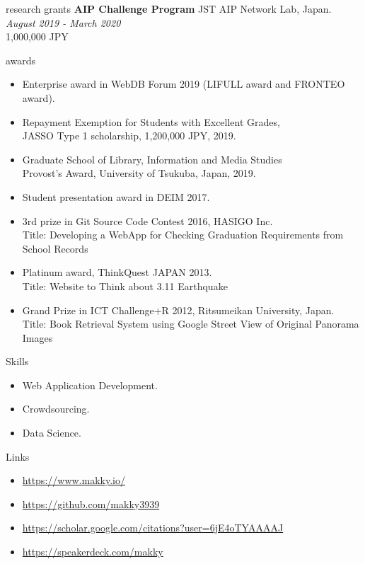 \documentclass{resume} %
\begin{document}
\begin{rSection}{research grants}
{\bf AIP Challenge Program } JST AIP Network Lab, Japan. \hfill {\em August 2019 - March 2020}
\\1,000,000 JPY

\end{rSection}


\begin{rSection}{awards}
\begin{itemize}
  \item Enterprise award in WebDB Forum 2019 (LIFULL award and FRONTEO award).
  \item Repayment Exemption for Students with Excellent Grades, \\JASSO Type 1 scholarship, 1,200,000 JPY, 2019.
  \item Graduate School of Library, Information and Media Studies \\Provost’s Award, University of Tsukuba, Japan, 2019.
  \item Student presentation award in DEIM 2017.
  \item 3rd prize in Git Source Code Contest 2016, HASIGO Inc. \\Title: Developing a WebApp for Checking Graduation Requirements from School Records
  \item Platinum award, ThinkQuest JAPAN 2013. \\Title: Website to Think about 3.11 Earthquake
  \item Grand Prize in ICT Challenge+R 2012, Ritsumeikan University, Japan. \\Title: Book Retrieval System using Google Street View of Original Panorama Images
\end{itemize}

\end{rSection}


\begin{rSection}{Skills}
\begin{itemize}
  \item Web Application Development.
  \item Crowdsourcing.
  \item Data Science.
\end{itemize}
\end{rSection}

\begin{rSection}{Links}
\begin{itemize}
  \item \url{https://www.makky.io/}
  \item \url{https://github.com/makky3939}
  \item \url{https://scholar.google.com/citations?user=6jE4oTYAAAAJ}
  \item \url{https://speakerdeck.com/makky}
\end{itemize}
\end{rSection}
\end{document}
